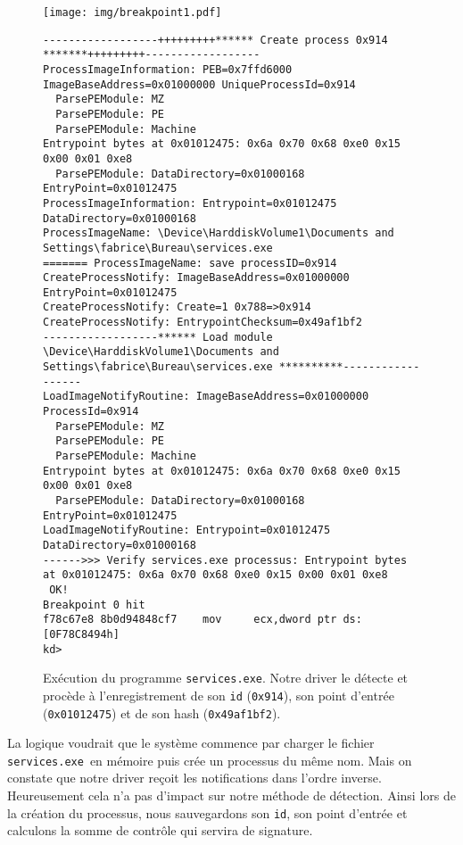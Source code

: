 \documentclass[times,11pt,fullpage]{article}
\newenvironment{changemargin}[2]{\begin{list}{}{%
\setlength{\topsep}{0pt}%
\setlength{\leftmargin}{0pt}%
\setlength{\rightmargin}{0pt}%
\setlength{\listparindent}{\parindent}%
\setlength{\itemindent}{\parindent}%
\setlength{\parsep}{0pt plus 1pt}%
\addtolength{\leftmargin}{#1}%
\addtolength{\rightmargin}{#2}%
}\item }{\end{list}}
\newcommand{\service}{\texttt{services.exe}}
\begin{document}
\begin{figure}
\begin{changemargin}{-2cm}{-2cm}
\begin{center}
 \texttt{[image: img/breakpoint1.pdf]}
\end{center}
\end{changemargin}
\scriptsize
\begin{verbatim}
------------------+++++++++****** Create process 0x914 *******+++++++++------------------
ProcessImageInformation: PEB=0x7ffd6000 ImageBaseAddress=0x01000000 UniqueProcessId=0x914 
  ParsePEModule: MZ
  ParsePEModule: PE
  ParsePEModule: Machine
Entrypoint bytes at 0x01012475: 0x6a 0x70 0x68 0xe0 0x15 0x00 0x01 0xe8
  ParsePEModule: DataDirectory=0x01000168 EntryPoint=0x01012475
ProcessImageInformation: Entrypoint=0x01012475 DataDirectory=0x01000168 
ProcessImageName: \Device\HarddiskVolume1\Documents and Settings\fabrice\Bureau\services.exe
======= ProcessImageName: save processID=0x914
CreateProcessNotify: ImageBaseAddress=0x01000000 EntryPoint=0x01012475 
CreateProcessNotify: Create=1 0x788=>0x914
CreateProcessNotify: EntrypointChecksum=0x49af1bf2
------------------****** Load module \Device\HarddiskVolume1\Documents and Settings\fabrice\Bureau\services.exe **********------------------
LoadImageNotifyRoutine: ImageBaseAddress=0x01000000 ProcessId=0x914 
  ParsePEModule: MZ
  ParsePEModule: PE
  ParsePEModule: Machine
Entrypoint bytes at 0x01012475: 0x6a 0x70 0x68 0xe0 0x15 0x00 0x01 0xe8
  ParsePEModule: DataDirectory=0x01000168 EntryPoint=0x01012475
LoadImageNotifyRoutine: Entrypoint=0x01012475 DataDirectory=0x01000168 
------>>> Verify services.exe processus: Entrypoint bytes at 0x01012475: 0x6a 0x70 0x68 0xe0 0x15 0x00 0x01 0xe8
 OK! 
Breakpoint 0 hit
f78c67e8 8b0d94848cf7    mov     ecx,dword ptr ds:[0F78C8494h]
kd>
\end{verbatim}
\caption{Exécution du programme \texttt{\service}. Notre driver le détecte et procède à l'enregistrement de son \texttt{id} (\texttt{0x914}), son point d'entrée (\texttt{0x01012475}) et de son hash (\texttt{0x49af1bf2}).\label{fig:Breakpoint1}}
\end{figure}

La logique voudrait que le système commence par charger le fichier \service\ en mémoire puis crée un processus du même nom. Mais on constate que notre driver reçoit les notifications dans l'ordre inverse. Heureusement cela n'a pas d'impact sur notre méthode de détection. Ainsi lors de la création du processus, nous sauvegardons son \texttt{id}, son point d'entrée et calculons la somme de contrôle qui servira de signature.  
\end{document}
